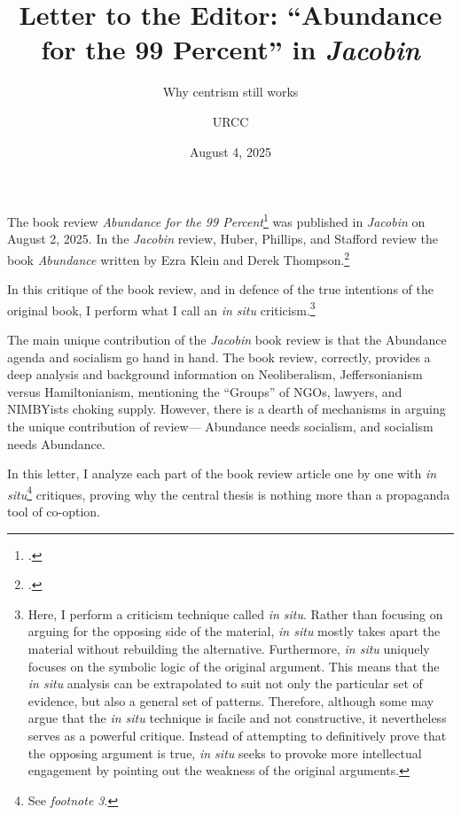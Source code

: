 \documentclass[12pt]{article}
\begin{document}
\title{Letter to the Editor: \enquote{Abundance for the 99 Percent} in \emph{Jacobin}}
\subtitle{Why centrism still works}
\author{URCC}

\date{August 4, 2025}

\maketitle

\begin{preamble}
	The book review \emph{Abundance for the 99 Percent}\footcite{huberAbundance99Percent2025} was published in \emph{Jacobin} on August 2, 2025. In the \emph{Jacobin} review, Huber, Phillips, and Stafford review the book \emph{Abundance} written by Ezra Klein and Derek Thompson.\footcite{kleinAbundance2025}

	In this critique of the book review, and in defence of the true intentions of the original book, I perform what I call an \emph{in situ} criticism.\footnote{Here, I perform a criticism technique called \emph{in situ}. Rather than focusing on arguing for the opposing side of the material, \emph{in situ} mostly takes apart the material without rebuilding the alternative. Furthermore, \emph{in situ} uniquely focuses on the symbolic logic of the original argument. This means that the \emph{in situ} analysis can be extrapolated to suit not only the particular set of evidence, but also a general set of patterns. Therefore, although some may argue that the \emph{in situ} technique is facile and not constructive, it nevertheless serves as a powerful critique. Instead of attempting to definitively prove that the opposing argument is true, \emph{in situ} seeks to provoke more intellectual engagement by pointing out the weakness of the original arguments.}
\end{preamble}

The main unique contribution of the \emph{Jacobin} book review is that the Abundance agenda and socialism go hand in hand. The book review, correctly, provides a deep analysis and background information on Neoliberalism, Jeffersonianism versus Hamiltonianism, mentioning the ``Groups'' of NGOs, lawyers, and NIMBYists choking supply. However, there is a dearth of mechanisms in arguing the unique contribution of review--- Abundance needs socialism, and socialism needs Abundance.

In this letter, I analyze each part of the book review article one by one with \emph{in situ}\footnote{See \emph{footnote 3}.} critiques, proving why the central thesis is nothing more than a propaganda tool of co-option.
\end{document}
